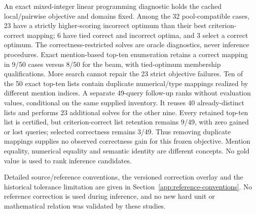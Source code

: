 An exact mixed-integer linear programming diagnostic holds the cached local/pairwise objective and
domains fixed. Among the 32 pool-compatible cases, 23 have a strictly
higher-scoring incorrect optimum than their best criterion-correct mapping;
6 have tied correct and incorrect optima, and 3 select a correct optimum.
The correctness-restricted solves are oracle diagnostics, never inference
procedures. Exact mention-based top-ten enumeration retains a correct
mapping in 9/50 cases versus 8/50 for the beam, with tied-optimum membership
qualifications. More search cannot repair the 23 strict objective failures.
Ten of the 50 exact top-ten lists contain duplicate numerical/type mappings
realized by different mention indices. A separate 49-query follow-up ranks without evaluation values, conditional on the same supplied inventory. It reuses
40 already-distinct lists and performs 23 additional solves for the other
nine. Every retained top-ten list is certified, but criterion-correct list
retention remains 9/49, with zero gained or lost queries; selected correctness
remains 3/49. Thus removing duplicate mappings supplies no observed
correctness gain for this frozen objective. Mention equality, numerical equality and semantic identity are
different concepts. No gold value is used to rank inference candidates.

Detailed source/reference conventions, the versioned correction overlay and the historical tolerance limitation are given in Section~\ref{app:reference-conventions}. No reference correction is used during inference, and no new hard unit or mathematical relation was validated by these studies.

